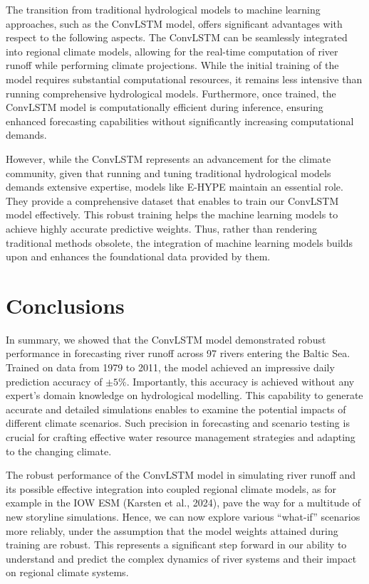 \documentclass[
]{agujournal2019}
\begin{document}
The transition from traditional hydrological models to machine learning
approaches, such as the ConvLSTM model, offers significant advantages
with respect to the following aspects. The ConvLSTM can be seamlessly
integrated into regional climate models, allowing for the real-time
computation of river runoff while performing climate projections. While
the initial training of the model requires substantial computational
resources, it remains less intensive than running comprehensive
hydrological models. Furthermore, once trained, the ConvLSTM model is
computationally efficient during inference, ensuring enhanced
forecasting capabilities without significantly increasing computational
demands.

However, while the ConvLSTM represents an advancement for the climate
community, given that running and tuning traditional hydrological models
demands extensive expertise, models like E-HYPE maintain an essential
role. They provide a comprehensive dataset that enables to train our
ConvLSTM model effectively. This robust training helps the machine
learning models to achieve highly accurate predictive weights. Thus,
rather than rendering traditional methods obsolete, the integration of
machine learning models builds upon and enhances the foundational data
provided by them.

\section{Conclusions}\label{sec-conclusions}

In summary, we showed that the ConvLSTM model demonstrated robust
performance in forecasting river runoff across 97 rivers entering the
Baltic Sea. Trained on data from 1979 to 2011, the model achieved an
impressive daily prediction accuracy of \(\pm 5 \%\). Importantly, this
accuracy is achieved without any expert's domain knowledge on
hydrological modelling. This capability to generate accurate and
detailed simulations enables to examine the potential impacts of
different climate scenarios. Such precision in forecasting and scenario
testing is crucial for crafting effective water resource management
strategies and adapting to the changing climate.

The robust performance of the ConvLSTM model in simulating river runoff
and its possible effective integration into coupled regional climate
models, as for example in the IOW ESM (Karsten et al., 2024), pave the
way for a multitude of new storyline simulations. Hence, we can now
explore various ``what-if'' scenarios more reliably, under the
assumption that the model weights attained during training are robust.
This represents a significant step forward in our ability to understand
and predict the complex dynamics of river systems and their impact on
regional climate systems.
\end{document}
